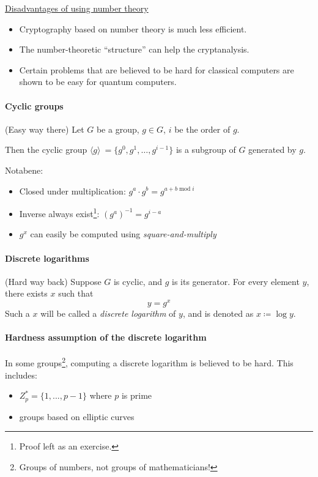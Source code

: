 \underline{Disadvantages of using number theory}

\begin{itemize}
    \item Cryptography based on number theory is much less efficient.
    \item The number-theoretic “structure” can help the cryptanalysis.
    \item Certain problems that are believed to be hard for classical computers are shown to be easy for quantum computers.
\end{itemize}

\paragraph{Cyclic groups} (Easy way there) Let $G$ be a group, $g \in G$, $i$ be the order of $g$.

Then the cyclic group $\langle g \rangle ~= \{g^0, g^1,\dots,g^{i-1}\}$ is a subgroup of $G$ generated by $g$.

Notabene:
\begin{itemize}
    \item Closed under multiplication: $g^a \cdot g^b = g^{a+b \operatorname{mod} i}$
    \item Inverse always exist\footnote{Proof left as an exercise.}: $(g^a)^{-1} = g ^{i-a}$
    \item $g^x$ can easily be computed using \textit{square-and-multiply}
\end{itemize}

\paragraph{Discrete logarithms} (Hard way back) Suppose $G$ is cyclic, and $g$ is its generator. For every element $y$, there exists $x$ such that 
$$y = g^x$$
Such a $x$ will be called a \textit{discrete logarithm} of $y$, and is denoted as $x \coloneqq \log y$.

\paragraph{Hardness assumption of the discrete logarithm}
In some groups\footnote{Groups of numbers, not groups of mathematicians!}, computing a discrete logarithm is believed to be hard. This includes:

\begin{itemize}
    \item $Z_p^* = \{ 1, ..., p-1 \}$ where $p$ is prime
    \item groups based on elliptic curves
\end{itemize}

